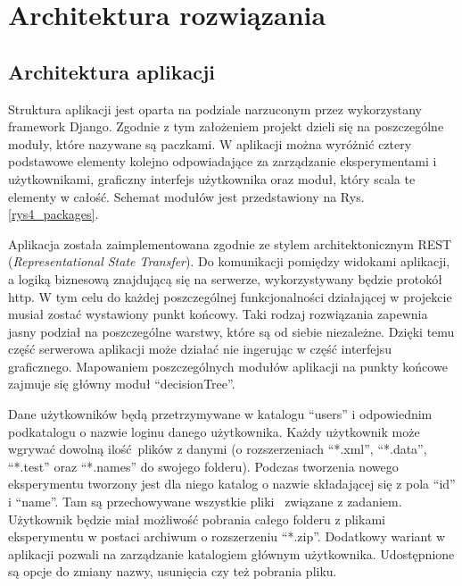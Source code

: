 \chapter{Architektura rozwiązania}
\section{Architektura aplikacji}
Struktura aplikacji jest oparta na podziale narzuconym przez wykorzystany framework Django. Zgodnie z tym założeniem projekt dzieli się na poszczególne moduły, które nazywane są paczkami.  W aplikacji można wyróżnić cztery podstawowe elementy kolejno odpowiadające za zarządzanie eksperymentami i użytkownikami, graficzny interfejs użytkownika oraz moduł, który scala te elementy w całość. Schemat modułów jest przedstawiony na Rys. \ref{rys4_packages}. 

Aplikacja została zaimplementowana zgodnie ze stylem architektonicznym REST (\textit{Representational State Transfer}). Do komunikacji pomiędzy widokami aplikacji, a logiką biznesową znajdującą się na serwerze, wykorzystywany będzie protokół http. W tym celu do każdej poszczególnej funkcjonalności działającej w projekcie musiał zostać wystawiony punkt końcowy. Taki rodzaj rozwiązania zapewnia jasny podział na poszczególne warstwy, które są od siebie niezależne. Dzięki temu część serwerowa aplikacji może działać nie ingerując w część interfejsu graficznego. Mapowaniem poszczególnych modułów aplikacji na punkty końcowe zajmuje się główny moduł \enquote{decisionTree}. 


Dane użytkowników będą przetrzymywane w katalogu \enquote{users} i odpowiednim podkatalogu o nazwie loginu danego użytkownika. Każdy użytkownik może wgrywać dowolną ilość plików z danymi (o rozszerzeniach \enquote{*.xml}, \enquote{*.data}, \enquote{*.test} oraz \enquote{*.names} do swojego folderu). Podczas tworzenia nowego eksperymentu tworzony jest dla niego katalog o nazwie składającej się z pola  \enquote{id} i \enquote{name}. Tam są przechowywane wszystkie pliki  związane z zadaniem. Użytkownik będzie miał możliwość pobrania całego folderu z plikami eksperymentu w postaci archiwum o rozszerzeniu  \enquote{*.zip}. Dodatkowy wariant w aplikacji pozwali na zarządzanie katalogiem głównym użytkownika. Udostępnione są opcje do zmiany nazwy, usunięcia czy też pobrania pliku. 

